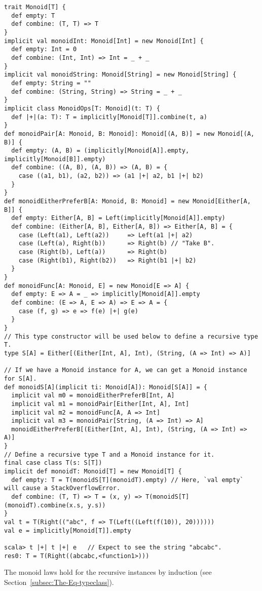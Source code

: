 \begin{lstlisting}[frame=single,fillcolor={\color{black}},framesep={0.2mm},framexleftmargin=2mm,framexrightmargin=2mm,framextopmargin=2mm,framexbottommargin=2mm]
trait Monoid[T] {
  def empty: T
  def combine: (T, T) => T
}
implicit val monoidInt: Monoid[Int] = new Monoid[Int] {
  def empty: Int = 0
  def combine: (Int, Int) => Int = _ + _
}
implicit val monoidString: Monoid[String] = new Monoid[String] {
  def empty: String = ""
  def combine: (String, String) => String = _ + _
}
implicit class MonoidOps[T: Monoid](t: T) {
  def |+|(a: T): T = implicitly[Monoid[T]].combine(t, a)
}
def monoidPair[A: Monoid, B: Monoid]: Monoid[(A, B)] = new Monoid[(A, B)] {
  def empty: (A, B) = (implicitly[Monoid[A]].empty, implicitly[Monoid[B]].empty)
  def combine: ((A, B), (A, B)) => (A, B) = {
    case ((a1, b1), (a2, b2)) => (a1 |+| a2, b1 |+| b2)
  }
}
def monoidEitherPreferB[A: Monoid, B: Monoid] = new Monoid[Either[A, B]] {
  def empty: Either[A, B] = Left(implicitly[Monoid[A]].empty)
  def combine: (Either[A, B], Either[A, B]) => Either[A, B] = {
    case (Left(a1), Left(a2))     => Left(a1 |+| a2)
    case (Left(a), Right(b))      => Right(b) // "Take B".
    case (Right(b), Left(a))      => Right(b)
    case (Right(b1), Right(b2))   => Right(b1 |+| b2)
  }
}
def monoidFunc[A: Monoid, E] = new Monoid[E => A] {
  def empty: E => A = _ => implicitly[Monoid[A]].empty
  def combine: (E => A, E => A) => E => A = {
    case (f, g) => e => f(e) |+| g(e)
  }
}
// This type constructor will be used below to define a recursive type T.
type S[A] = Either[(Either[Int, A], Int), (String, (A => Int) => A)]

// If we have a Monoid instance for A, we can get a Monoid instance for S[A].
def monoidS[A](implicit ti: Monoid[A]): Monoid[S[A]] = {
  implicit val m0 = monoidEitherPreferB[Int, A]
  implicit val m1 = monoidPair[Either[Int, A], Int]
  implicit val m2 = monoidFunc[A, A => Int]
  implicit val m3 = monoidPair[String, (A => Int) => A]
  monoidEitherPreferB[(Either[Int, A], Int), (String, (A => Int) => A)]
}
// Define a recursive type T and a Monoid instance for it.
final case class T(s: S[T])
implicit def monoidT: Monoid[T] = new Monoid[T] {
  def empty: T = T(monoidS[T](monoidT).empty) // Here, `val empty` will cause a StackOverflowError.
  def combine: (T, T) => T = (x, y) => T(monoidS[T](monoidT).combine(x.s, y.s))
}
val t = T(Right(("abc", f => T(Left((Left(f(10)), 20))))))
val e = implicitly[Monoid[T]].empty

scala> t |+| t |+| e   // Expect to see the string "abcabc".
res0: T = T(Right((abcabc,<function1>)))
\end{lstlisting}
The monoid laws hold for the recursive instances by induction (see
Section~\ref{subsec:The-Eq-typeclass}).

